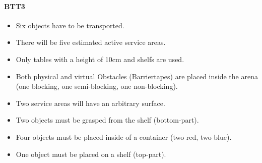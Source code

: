 \paragraph{BTT3}
\begin{itemize}
\item Six objects have to be transported.
\item There will be five estimated active service areas.
\item Only tables with a height of 10cm and shelfs are used.
\item Both physical and virtual Obstacles (Barriertapes) are placed inside the arena (one blocking, one semi-blocking, one non-blocking).
\item Two service areas will have an arbitrary surface.
\item Two objects must be grasped from the shelf (bottom-part).
\item Four objects must be placed inside of a container (two red, two blue). 
\item One object must be placed on a shelf (top-part).
\end{itemize}



